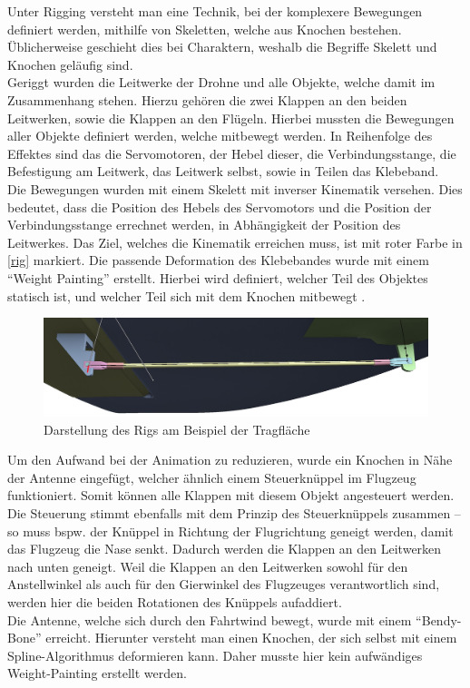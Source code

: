 Unter Rigging versteht man eine Technik, bei der komplexere Bewegungen definiert werden, mithilfe von Skeletten, welche aus Knochen bestehen. Üblicherweise geschieht dies bei Charaktern, weshalb die Begriffe Skelett und Knochen geläufig sind. \\
Geriggt wurden die Leitwerke der Drohne und alle Objekte, welche damit im Zusammenhang stehen. 
Hierzu gehören die zwei Klappen an den beiden Leitwerken, sowie die Klappen an den Flügeln. Hierbei mussten die Bewegungen aller Objekte definiert werden, welche mitbewegt werden. In Reihenfolge des Effektes sind das die Servomotoren, der Hebel dieser, die Verbindungsstange, die Befestigung am Leitwerk, das Leitwerk selbst, sowie in Teilen das Klebeband.\\
Die Bewegungen wurden mit einem Skelett mit inverser Kinematik versehen. Dies bedeutet, dass die Position des Hebels des Servomotors und die Position der Verbindungsstange errechnet werden, in Abhängigkeit der Position des Leitwerkes. Das Ziel, welches die Kinematik erreichen muss, ist mit roter Farbe in \autoref{rig} markiert. Die passende Deformation des Klebebandes wurde mit einem ``Weight Painting'' erstellt. Hierbei wird definiert, welcher Teil des Objektes statisch ist, und welcher Teil sich mit dem Knochen mitbewegt .

\begin{figure}[H]
\begin{center}
\includegraphics[width=\textwidth]{gfx/prod/plane/plane7.jpg}
\caption{Darstellung des Rigs am Beispiel der Tragfläche}
\label{rig}
\end{center}
\end{figure}
\noindent
Um den Aufwand bei der Animation zu reduzieren, wurde ein Knochen in Nähe der Antenne eingefügt, welcher ähnlich einem Steuerknüppel im Flugzeug funktioniert. Somit können alle Klappen mit diesem Objekt angesteuert werden. Die Steuerung stimmt ebenfalls mit dem Prinzip des Steuerknüppels zusammen -- so muss bspw. der Knüppel in Richtung der Flugrichtung geneigt werden, damit das Flugzeug die Nase senkt. Dadurch werden die Klappen an den Leitwerken nach unten geneigt. Weil die Klappen an den Leitwerken sowohl für den Anstellwinkel als auch für den Gierwinkel des Flugzeuges verantwortlich sind, werden hier die beiden Rotationen des Knüppels aufaddiert.\\
Die Antenne, welche sich durch den Fahrtwind bewegt, wurde mit einem ``Bendy-Bone'' erreicht. Hierunter versteht man einen Knochen, der sich selbst mit einem Spline-Algorithmus deformieren kann. Daher musste hier kein aufwändiges Weight-Painting erstellt werden. 

